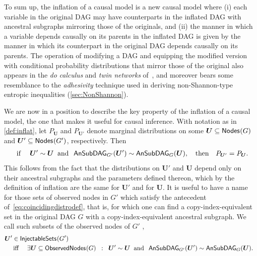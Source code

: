 \documentclass[aps,english,superscriptaddress,onecolumn,twoside,longbibliography,pra,floatfix,fleqn,nofootinbib]{revtex4-1}%
\newcommand*{\tblue}[1]{{\color{MidnightBlue}{\textbf{#1}}}}
\theoremstyle{definition}
\newcommand{\SmallNamedFunction}[3][]{\operatorname{\mathsf{#2}}_{#1}\parenths{#3}}
\newcommand{\ansubgraph}[2][]{\SmallNamedFunction[#1]{AnSubDAG}{#2}}
\newcommand{\nodes}[1]{\SmallNamedFunction{Nodes}{#1}}
\DeclarePairedDelimiter{\parenths}{\lparen}{\rparen}
\begin{document}
To sum up, the inflation of a causal model is a new causal model where (i) each variable in the original DAG may have counterparts in the inflated DAG with ancestral subgraphs mirroring those of the originals, and (ii) the manner in which a variable depends causally on its parents in the inflated DAG is given by the manner in which its counterpart in the original DAG depends causally on its parents. The operation of modifying a DAG and equipping the modified version with conditional probability distributions that mirror those of the original also appears in the \emph{do calculus} and \emph{twin networks} of~\citet{pearl2009causality}, and moreover bears some resemblance to the \emph{adhesivity} technique used in deriving non-Shannon-type entropic inequalities (\cref{sec:NonShannon}).

We are now in a position to describe the key property of the inflation of a causal model, the one that makes it useful for causal inference. With notation as in \cref{def:inflat}, let %
$P_{\bm{U}}$ and $P_{\bm{U}'}$ denote marginal distributions on some $\bm{U}\subseteq\nodes{G}$ and $\bm{U}'\subseteq\nodes{G'}$, respectively. Then
\begin{align}\label{eq:coincidingdistrodef}
\quad\text{if }\quad \bm{U}'\sim \bm{U} \;\;\text{and}\;\; \ansubgraph[G']{\bm{U}'}\sim\ansubgraph[G]{\bm{U}}, \quad\text{then}\quad P_{\bm{U}'}=P_{\bm{U}}.
\end{align}
This follows from the fact that the distributions on $\bm{U}'$ and $\bm{U}$ depend only on their ancestral subgraphs and the parameters defined thereon, which by the definition of inflation are the same for $\bm{U}'$ and for $\bm{U}$.
It is useful to have a name for those sets of observed nodes in $G'$ which satisfy the antecedent of~\cref{eq:coincidingdistrodef}, that is, for which one can find a copy-index-equivalent set in the original DAG $G$ with a copy-index-equivalent ancestral subgraph.  We call such subsets of the observed nodes of $G'$ \tblue{injectable sets},
\begin{align}\begin{split}\label{eq:definjectable}
&\bm{U}'\in\SmallNamedFunction{InjectableSets}{G'} \\
&\quad\text{ iff }\quad \exists \bm{U}\subseteq \SmallNamedFunction{ObservedNodes}{G} \;\; :\;\; \bm{U}'\sim\bm{U} \;\;\text{and}\;\; \ansubgraph[G']{\bm{U}'}\sim\ansubgraph[G]{\bm{U}}.
\end{split}\end{align}
\end{document}
